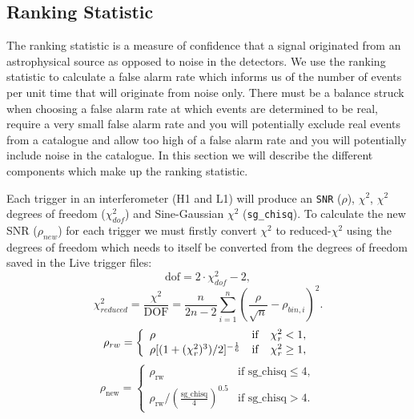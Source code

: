 \subsection{\label{2:sec:ranking-statistic}Ranking Statistic}
The ranking statistic is a measure of confidence that a signal originated from an astrophysical source as opposed to noise in the detectors. We use the ranking statistic to calculate a false alarm rate which informs us of the number of events per unit time that will originate from noise only. There must be a balance struck when choosing a false alarm rate at which events are determined to be real, require a very small false alarm rate and you will potentially exclude real events from a catalogue and allow too high of a false alarm rate and you will potentially include noise in the catalogue. In this section we will describe the different components which make up the ranking statistic.

Each trigger in an interferometer (H1 and L1) will produce an \verb|SNR| ($\rho$), $\chi^{2}$, $\chi^{2}$ degrees of freedom ($\chi^{2}_{dof}$) and Sine-Gaussian $\chi^{2}$ (\verb|sg_chisq|). To calculate the new SNR ($\rho_{new}$) for each trigger we must firstly convert $\chi^{2}$ to reduced-$\chi^{2}$ using the degrees of freedom which needs to itself be converted from the degrees of freedom saved in the Live trigger files:
%
\begin{equation}
\text{dof} = 2 \cdot \chi^{2}_{dof} - 2,
\end{equation}
%
\begin{equation}
  \chi_{reduced}^{2} = \frac{\chi^{2}}{\textrm{DOF}} = \frac{n}{2n - 2} \sum_{i=1}^n \left(\frac{\rho}{\sqrt{n}} - \rho_{bin,i}\right)^2.
  \label{2:eqn:chi_squared}
\end{equation}
%
\begin{equation}
\rho_{rw} =  \left\{  \begin{array}{l@{\quad}cr} 
\rho & \mathrm{if} & \chi_{r}^{2} < 1, \\  
\rho [(1 + (\chi_{r}^{2})^3)/2]^{-\frac{1}{6}} &  \mathrm{if} & \chi_{r}^{2} \ge 1,   
\end{array}\right.
\label{2:eqn:allen-reweighting}
\end{equation}
%
\begin{equation}
\rho_{\text{new}} = 
\begin{cases} 
\rho_{\text{rw}} & \text{if } \text{sg\_chisq} \leq 4, \\  
\rho_{\text{rw}}  / \left(\frac{\text{sg\_chisq}}{4}\right)^{0.5} & \text{if } \text{sg\_chisq} > 4.
\end{cases}
\label{2:eqn:sg-reweighting}
\end{equation}

